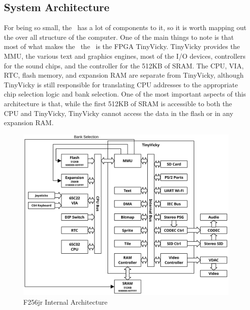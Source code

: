 \subsection*{System Architecture}

For being so small, the \jr\ has a lot of components to it, so it is worth mapping out the over all structure of the computer. One of the main things to note is that most of what makes the \jr\ the \jr\ is the FPGA TinyVicky. TinyVicky provides the MMU, the various text and graphics engines, most of the I/O devices, controllers for the sound chips, and the controller for the 512KB of SRAM. The CPU, VIA, RTC, flash memory, and expansion RAM are separate from TinyVicky, although TinyVicky is still responsible for translating CPU addresses to the appropriate chip selection logic and bank selection. One of the most important aspects of this architecture is that, while the first 512KB of SRAM is accessible to both the CPU and TinyVicky, TinyVicky cannot access the data in the flash or in any expansion RAM.

\begin{figure}[ht]
    \begin{center}
        \includegraphics[scale=0.55]{images/f256jr_layout.pdf}
    \end{center}
    \caption{F256jr Internal Architecture}
    \label{fig:arch}
\end{figure}
